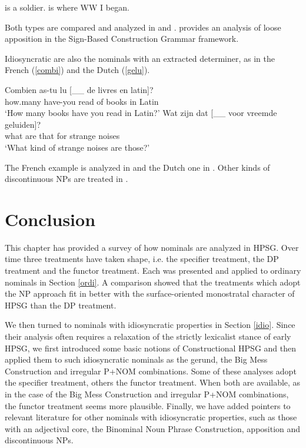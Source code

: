 \documentclass[output=paper
                ,modfonts
                ,nonflat
	        ,collection
	        ,collectionchapter
	        ,collectiontoclongg
 	        ,biblatex
                ,babelshorthands
                ,newtxmath
                ,draftmode
                ,colorlinks, citecolor=brown
]{./langsci/langscibook}
\begin{document}
\begin{exe} 
\ex\label{appo} 
\begin{xlist} 
 is a soldier.  
 is where WW I began.
\end{xlist} 
\end{exe}

\noindent
Both types are compared and analyzed in \citet{Kim12} and \citet{Kim14}. 
\citet{VanEyndeKim16} provides an analysis of loose apposition in the 
Sign-Based Construction Grammar framework. 

Idiosyncratic are also the nominals with an extracted determiner, as in 
the French (\ref{combi}) and the Dutch (\ref{gelu}). 

\begin{exe} 
\ex\label{combi}  
\gll   Combien as-tu lu [\_\_ de livres en latin]?  \\
       how.many have-you read {} of books in Latin  \\ 
\trans `How many books have you read in Latin?' 
\ex\label{gelu}
\gll   Wat zijn dat [\_\_ voor vreemde geluiden]? \\
       what are that {} for strange noises        \\ 
\trans `What kind of strange noises are those?'  
\end{exe} 

\noindent
The French example is analyzed in \citet[20--21]{Abeilleetal04} and the Dutch one in 
\citet[47--50]{VanEynde04}. Other kinds of discontinuous NPs are treated in \citet{DeKuthy2000}. 


\section{Conclusion} 


This chapter has provided a survey of how nominals are analyzed in HPSG. 
Over time three treatments have taken shape, i.e. the specifier treatment, 
the DP treatment and the functor treatment. 
Each was presented and applied to ordinary nominals in Section \ref{ordi}. 
A comparison showed that the treatments which adopt the NP approach fit in better with 
the surface-oriented monostratal character of HPSG than the DP treatment. 

We then turned to nominals with idiosyncratic properties in Section \ref{idio}.
Since their analysis often requires a relaxation of the strictly lexicalist stance of early HPSG, 
we first introduced some basic notions of Constructional HPSG and then applied them to 
such idiosyncratic nominals as the gerund, the Big Mess Construction and irregular P+NOM combinations.  
Some of these analyses adopt the specifier treatment, others the functor treatment. 
When both are available, as in the case of the Big Mess Construction and  
irregular P+NOM combinations, the functor treatment seems more plausible. 
Finally, we have added pointers to relevant literature for other nominals with idiosyncratic properties,
such as those with an adjectival core, the Binominal Noun Phrase Construction, apposition 
and discontinuous NPs. 
\end{document}
